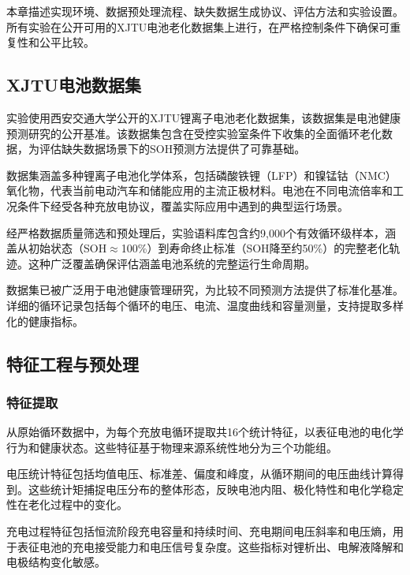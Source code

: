 \documentclass[10pt,a4paper]{ctexart}
\begin{document}
本章描述实现环境、数据预处理流程、缺失数据生成协议、评估方法和实验设置。所有实验在公开可用的XJTU电池老化数据集上进行，在严格控制条件下确保可重复性和公平比较。

\subsection{XJTU电池数据集}\label{sec:xjtu}

实验使用西安交通大学公开的XJTU锂离子电池老化数据集\cite{wang2024open,duan2025lithium,wang2024pinn}，该数据集是电池健康预测研究的公开基准。该数据集包含在受控实验室条件下收集的全面循环老化数据，为评估缺失数据场景下的SOH预测方法提供了可靠基础。

数据集涵盖多种锂离子电池化学体系，包括磷酸铁锂（LFP）和镍锰钴（NMC）氧化物，代表当前电动汽车和储能应用的主流正极材料。电池在不同电流倍率和工况条件下经受各种充放电协议，覆盖实际应用中遇到的典型运行场景。

经严格数据质量筛选和预处理后，实验语料库包含约9,000个有效循环级样本，涵盖从初始状态（SOH$\approx$100\%）到寿命终止标准（SOH降至约50\%）的完整老化轨迹。这种广泛覆盖确保评估涵盖电池系统的完整运行生命周期。

数据集已被广泛用于电池健康管理研究，为比较不同预测方法提供了标准化基准。详细的循环记录包括每个循环的电压、电流、温度曲线和容量测量，支持提取多样化的健康指标。

\subsection{特征工程与预处理}\label{sec:features}

\subsubsection{特征提取}

从原始循环数据中，为每个充放电循环提取共16个统计特征，以表征电池的电化学行为和健康状态。这些特征基于物理来源系统性地分为三个功能组。

电压统计特征包括均值电压、标准差、偏度和峰度，从循环期间的电压曲线计算得到。这些统计矩捕捉电压分布的整体形态，反映电池内阻、极化特性和电化学稳定性在老化过程中的变化。

充电过程特征包括恒流阶段充电容量和持续时间、充电期间电压斜率和电压熵，用于表征电池的充电接受能力和电压信号复杂度。这些指标对锂析出、电解液降解和电极结构变化敏感。
\end{document}
